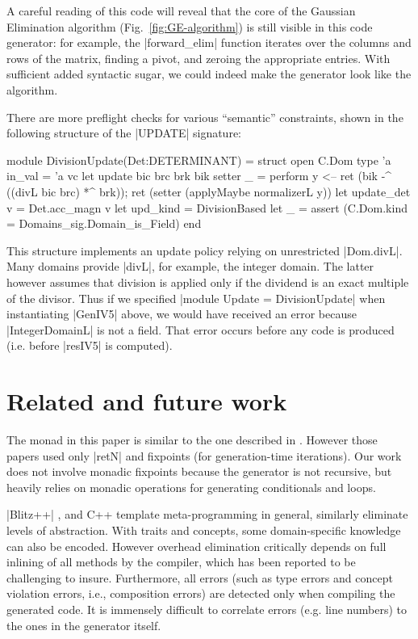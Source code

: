 \documentclass{elsart}
\begin{document}
A careful reading of this code will reveal that the core of the 
Gaussian Elimination algorithm (Fig.~\ref{fig:GE-algorithm}) 
is still visible in this code generator: for example,
the |forward_elim| function iterates over the columns and rows of the
matrix, finding a pivot, and zeroing the appropriate entries.  With
sufficient added syntactic sugar, we could indeed make the generator look
like the algorithm.

There are more preflight checks for various ``semantic'' constraints, shown
in the following structure of the |UPDATE| signature:
\begin{code}
module DivisionUpdate(Det:DETERMINANT) = struct
  open C.Dom
  type 'a in_val = 'a vc
  let update bic brc brk bik setter _ = perform
      y <-- ret (bik -^ ((divL bic brc) *^ brk));
      ret (setter (applyMaybe normalizerL y))
  let update_det v = Det.acc_magn v
  let upd_kind = DivisionBased
  let _ = assert (C.Dom.kind = Domains_sig.Domain_is_Field)
end
\end{code}
%
This structure implements an update policy relying on
unrestricted |Dom.divL|. Many domains provide |divL|, for example,
the integer domain. The latter however assumes that division is applied
only if the dividend is an exact multiple of the divisor. Thus if we
specified |module Update = DivisionUpdate| when instantiating |GenIV5|
above, we would have received an error because |IntegerDomainL| is not
a field. That error occurs before any code is produced (i.e.
before |resIV5| is computed).

\section{Related and future work}\label{related}

The monad in this paper is similar to the one described in
\cite{SwadiMonadic06,KiselyovTaha}.  However those papers used only
|retN| and fixpoints (for generation-time iterations).  Our work
does not involve monadic fixpoints because the generator is not
recursive, but heavily relies on monadic operations for generating
conditionals and loops.

|Blitz++| \cite{Veldhuizen:1998:ISCOPE}, and {C++} template
meta-programming in general, similarly eliminate levels
of abstraction.  With traits and concepts, some domain-specific
knowledge can also be encoded.  However overhead elimination
critically depends on full inlining of all methods by the compiler,
which has been reported to be challenging to insure. Furthermore, all
errors (such as type errors and concept violation errors, i.e.,
composition errors) are detected only when compiling the generated
code. It is immensely difficult to correlate errors (e.g. line
numbers) to the ones in the generator itself.
\end{document}
